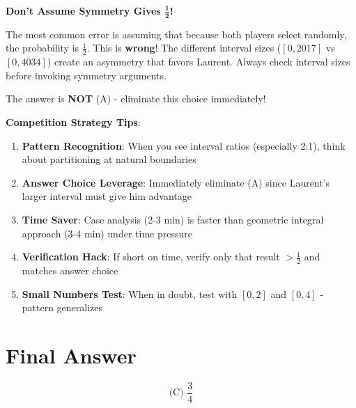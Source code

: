 \documentclass[]{article}
\begin{document}
\begin{warningbox}
\textbf{Don't Assume Symmetry Gives $\mathbf{\frac{1}{2}}$!}

The most common error is assuming that because both players select randomly, the probability is $\frac{1}{2}$. This is \textbf{wrong}! The different interval sizes ($[0, 2017]$ vs $[0, 4034]$) create an asymmetry that favors Laurent. Always check interval sizes before invoking symmetry arguments.

The answer is \textbf{NOT} (A) - eliminate this choice immediately!
\end{warningbox}

\begin{tipbox}
\textbf{Competition Strategy Tips}:
\begin{enumerate}
    \item \textbf{Pattern Recognition}: When you see interval ratios (especially 2:1), think about partitioning at natural boundaries
    \item \textbf{Answer Choice Leverage}: Immediately eliminate (A) since Laurent's larger interval must give him advantage
    \item \textbf{Time Saver}: Case analysis (2-3 min) is faster than geometric integral approach (3-4 min) under time pressure
    \item \textbf{Verification Hack}: If short on time, verify only that result $> \frac{1}{2}$ and matches answer choice
    \item \textbf{Small Numbers Test}: When in doubt, test with $[0,2]$ and $[0,4]$ - pattern generalizes
\end{enumerate}
\end{tipbox}

\section*{Final Answer}
\[\boxed{\text{(C) } \frac{3}{4}}\]
\end{document}
